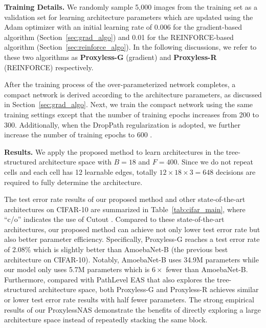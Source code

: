 \documentclass{article} \usepackage{iclr2019_conference,times}
\newcommand{\minisection}[1]{\vspace{5pt}\noindent\textbf{#1.}}
\begin{document}
\minisection{Training Details} We randomly sample 5,000 images from the training set as a validation set for learning architecture parameters which are updated using the Adam optimizer with an initial learning rate of 0.006 for the gradient-based algorithm (Section~\ref{sec:grad_algo}) and 0.01 for the REINFORCE-based algorithm (Section~\ref{sec:reinforce_algo}). In the following discussions, we refer to these two algorithms as \textbf{Proxyless-G} (gradient) and \textbf{Proxyless-R} (REINFORCE) respectively. 

After the training process of the over-parameterized network completes, a compact network is derived according to the architecture parameters, as discussed in Section~\ref{sec:grad_algo}. Next, we train the compact network using the same training settings except that the number of training epochs increases from 200 to 300. Additionally, when the DropPath regularization \citep{zoph2017learning,huang2016deep} is adopted, we further increase the number of training epochs to 600 \citep{zoph2017learning}. 

\minisection{Results} We apply the proposed method to learn architectures in the tree-structured architecture space with $B = 18$ and $F = 400$. Since we do not repeat cells and each cell has 12 learnable edges, totally $12 \times 18 \times 3 = 648$ decisions are required to fully determine the architecture.

The test error rate results of our proposed method and other state-of-the-art architectures on CIFAR-10 are summarized in Table~\ref{tab:cifar_main}, where ``c/o'' indicates the use of Cutout \citep{devries2017improved}. Compared to these state-of-the-art architectures, our proposed method can achieve not only lower test error rate but also better parameter efficiency. Specifically, Proxyless-G reaches a test error rate of 2.08\% which is slightly better than AmoebaNet-B \citep{real2018regularized} (the previous best architecture on CIFAR-10). Notably, AmoebaNet-B uses 34.9M parameters while our model only uses 5.7M parameters which is $6 \times$ fewer than AmoebaNet-B. 
Furthermore, compared with PathLevel EAS \citep{cai2018path} that also explores the tree-structured architecture space, both Proxyless-G and Proxyless-R achieves similar or lower test error rate results with half fewer parameters. 
The strong empirical results of our ProxylessNAS demonstrate the benefits of directly exploring a large architecture space instead of repeatedly stacking the same block. 
\end{document}
